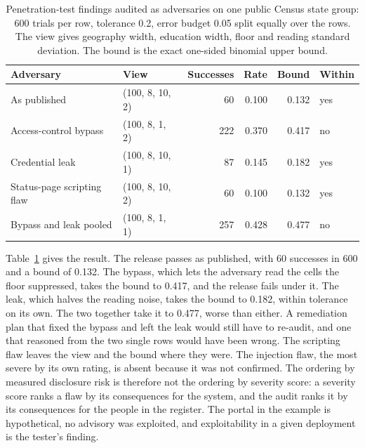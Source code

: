 \begin{table}[ht]
\centering
\caption{Penetration-test findings audited as adversaries on one public Census state
group: 600 trials per row, tolerance 0.2, error budget 0.05 split equally over the rows.
The view gives geography width, education width, floor and reading standard deviation.
The bound is the exact one-sided binomial upper bound.}
\label{c14:tab-pentest}
\small
\begin{tabular}{llrrrl}
\toprule
Adversary & View & Successes & Rate & Bound & Within \\
\midrule
As published                        & (100, 8, 10, 2) & 60  & 0.100 & 0.132 & yes \\
Access-control bypass               & (100, 8, 1, 2)  & 222 & 0.370 & 0.417 & no \\
Credential leak                     & (100, 8, 10, 1) & 87  & 0.145 & 0.182 & yes \\
Status-page scripting flaw          & (100, 8, 10, 2) & 60  & 0.100 & 0.132 & yes \\
Bypass and leak pooled              & (100, 8, 1, 1)  & 257 & 0.428 & 0.477 & no \\
\bottomrule
\end{tabular}
\end{table}

Table~\ref{c14:tab-pentest} gives the result. The release passes as published, with 60
successes in 600 and a bound of 0.132. The bypass, which lets the adversary read the
cells the floor suppressed, takes the bound to 0.417, and the release fails under it.
The leak, which halves the reading noise, takes the bound to 0.182, within tolerance
on its own. The two together take it to 0.477, worse than either. A remediation plan
that fixed the bypass and left the leak would still have to re-audit, and one that
reasoned from the two single rows would have been wrong. The scripting flaw leaves the
view and the bound where they were. The injection flaw, the most severe by its own
rating, is absent because it was not confirmed.
The ordering by measured disclosure risk is therefore not the ordering by severity
score: a severity score ranks a flaw by its consequences for the system, and the audit
ranks it by its consequences for the people in the register. The portal in the example
is hypothetical, no advisory was exploited, and exploitability in a given deployment is
the tester's finding.

